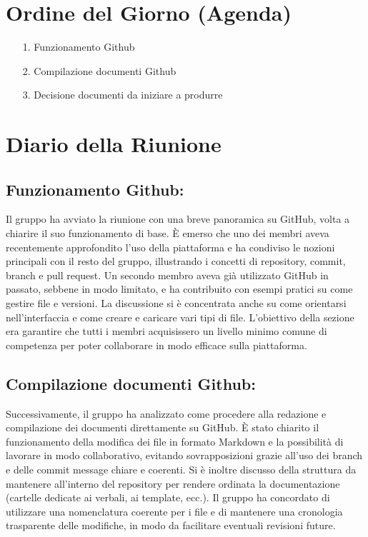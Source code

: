 \documentclass[a4paper, 11pt, oneside]{scrartcl} %
\begin{document}
\newpage
\section{Ordine del Giorno (Agenda)}
\begin{itemize}
    \item[1.] Funzionamento Github
    \item[2.] Compilazione documenti Github
    \item[3.] Decisione documenti da iniziare a produrre
\end{itemize}

\newpage
\section{Diario della Riunione}

\subsection{Funzionamento Github:}
Il gruppo ha avviato la riunione con una breve panoramica su GitHub, volta a chiarire il suo funzionamento di base.
È emerso che uno dei membri aveva recentemente approfondito l’uso della piattaforma e ha condiviso le nozioni principali con il resto del gruppo, illustrando i concetti di repository, commit, branch e pull request.
Un secondo membro aveva già utilizzato GitHub in passato, sebbene in modo limitato, e ha contribuito con esempi pratici su come gestire file e versioni.
La discussione si è concentrata anche su come orientarsi nell’interfaccia e come creare e caricare vari tipi di file.
L’obiettivo della sezione era garantire che tutti i membri acquisissero un livello minimo comune di competenza per poter collaborare in modo efficace sulla piattaforma.

\subsection{Compilazione documenti Github:}
Successivamente, il gruppo ha analizzato come procedere alla redazione e compilazione dei documenti direttamente su GitHub.
È stato chiarito il funzionamento della modifica dei file in formato Markdown e la possibilità di lavorare in modo collaborativo, evitando sovrapposizioni grazie all’uso dei branch e delle commit message chiare e coerenti.
Si è inoltre discusso della struttura da mantenere all’interno del repository per rendere ordinata la documentazione (cartelle dedicate ai verbali, ai template, ecc.).
Il gruppo ha concordato di utilizzare una nomenclatura coerente per i file e di mantenere una cronologia trasparente delle modifiche, in modo da facilitare eventuali revisioni future.
\end{document}
